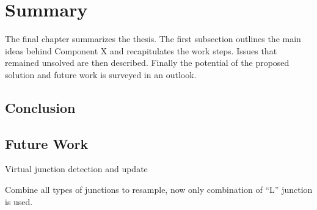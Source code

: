 \chapter{Summary\label{cha:chapter7}}
The final chapter summarizes the thesis. The first subsection outlines the main ideas behind Component X and recapitulates the work steps. Issues that remained unsolved are then described. Finally the potential of the proposed solution and future work is surveyed in an outlook.

\section{Conclusion\label{sec:conclusion}}


\section{Future Work\label{sec:future}}
Virtual junction detection and update

Combine all types of junctions to resample, now only combination of ``L'' junction is used.

